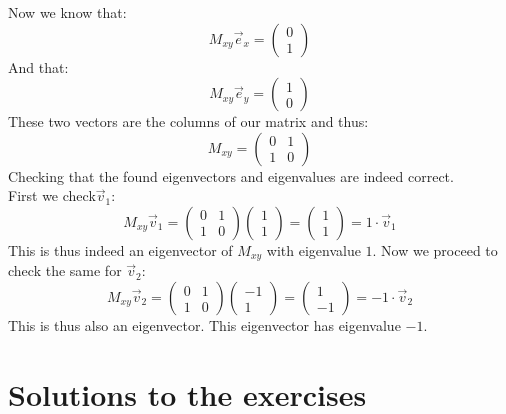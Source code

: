 \documentclass[a4paper]{report}
\begin{document}
\begin{Answer}[ref=eigen2]
\begin{tikzpicture}
\end{tikzpicture}
Now we know that:
\begin{equation*}
M_{xy}\vec{e}_x=\begin{pmatrix}0\\1\end{pmatrix}
\end{equation*}
And that:
\begin{equation*}
M_{xy}\vec{e}_y=\begin{pmatrix}1\\0\end{pmatrix}
\end{equation*}
These two vectors are the columns of our matrix and thus:
\begin{equation*}
M_{xy}=\begin{pmatrix}0&1\\1&0\end{pmatrix}
\end{equation*}
\Question Checking that the found eigenvectors and eigenvalues are indeed correct.\\
First we check$ \vec{v}_1$:
\begin{equation*}
M_{xy}\vec{v}_1=\begin{pmatrix}0&1\\1&0\end{pmatrix}\begin{pmatrix}1\\1\end{pmatrix}=\begin{pmatrix}1\\1\end{pmatrix}=1 \cdot \vec{v}_1
\end{equation*}
This is thus indeed an eigenvector of $M_{xy}$ with eigenvalue $1$. Now we proceed to check the same for $\vec{v}_2$:
\begin{equation*}
M_{xy}\vec{v}_2=\begin{pmatrix}0&1\\1&0\end{pmatrix}\begin{pmatrix}-1\\1\end{pmatrix}=\begin{pmatrix}1\\-1\end{pmatrix}=-1 \cdot \vec{v}_2
\end{equation*}
This is thus also an eigenvector. This eigenvector has eigenvalue $-1$.
\end{Answer}



\chapter{Solutions to the exercises}
\shipoutAnswer
\end{document}
